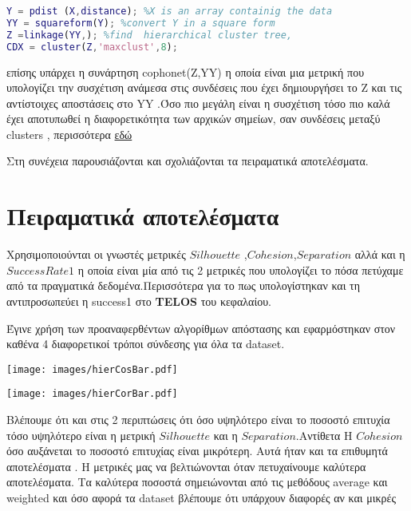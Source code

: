 \begin{lstlisting}[language=Matlab]
%simple example of hierarchical clustering
Y = pdist (X,distance); %X is an array containig the data
YY = squareform(Y); %convert Y in a square form
Z =linkage(YY,); %find  hierarchical cluster tree,
CDX = cluster(Z,'maxclust',8);
\end{lstlisting}


επίσης υπάρχει η συνάρτηση cophonet(Z,YY) η οποία είναι μια μετρική που υπολογίζει την συσχέτιση ανάμεσα στις συνδέσεις που έχει δημιουργήσει το Z και τις αντίστοιχες αποστάσεις στο YY .Όσο πιο μεγάλη είναι η συσχέτιση τόσο πιο καλά έχει αποτυπωθεί η διαφορετικότητα των αρχικών σημείων, σαν συνδέσεις μεταξύ clusters , περισσότερα
\href{https://en.wikipedia.org/wiki/Cophenetic_correlation}{εδώ}

Στη συνέχεια παρουσιάζονται και σχολιάζονται τα πειραματικά αποτελέσματα.

\section{Πειραματικά αποτελέσματα}

Χρησιμοποιούνται οι γνωστές μετρικές $Silhouette$ ,$Cohesion$,$Separation$
αλλά και η $Success Rate 1$ η οποία είναι μία από τις 2 μετρικές που  υπολογίζει το πόσα πετύχαμε από τα πραγματικά δεδομένα.Περισσότερα για το πως υπολογίστηκαν και τη αντιπροσωπεύει η success1 στο \textbf{TELOS} του κεφαλαίου.    

Έγινε χρήση των προαναφερθέντων αλγορίθμων απόστασης και εφαρμόστηκαν στον καθένα 4 διαφορετικοί τρόποι σύνδεσης για όλα τα dataset.

\noindent\begin{minipage}{\linewidth}
    \centering
    \texttt{[image: images/hierCosBar.pdf]}
    \label{fig:CosineHier}
\end{minipage}

\noindent\begin{minipage}{\linewidth}
    \centering
    \texttt{[image: images/hierCorBar.pdf]}
    \label{fig:hierCorBar}
\end{minipage}

\newpage
Βλέπουμε ότι και στις 2 περιπτώσεις ότι όσο υψηλότερο είναι το ποσοστό επιτυχία
τόσο υψηλότερο είναι  η μετρική $Silhouette$ και η $Separation$.Αντίθετα H $Cohesion$ όσο αυξάνεται το ποσοστό επιτυχίας είναι μικρότερη. Αυτά ήταν και τα επιθυμητά αποτελέσματα . Η μετρικές μας να βελτιώνονται όταν πετυχαίνουμε καλύτερα αποτελέσματα. 
Τα καλύτερα ποσοστά σημειώνονται από τις μεθόδους average και weighted
και όσο αφορά τα dataset βλέπουμε ότι υπάρχουν διαφορές αν και μικρές

